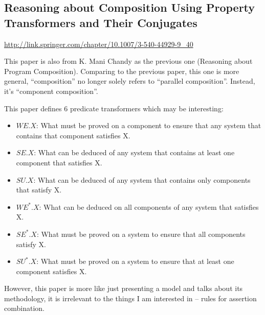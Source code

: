 \documentclass[12pt, fleqn]{article}
\begin{document}
\subsection{Reasoning about Composition Using Property Transformers and Their Conjugates}

\url{http://link.springer.com/chapter/10.1007/3-540-44929-9_40}

\bigskip

This paper is also from K. Mani Chandy as the previous one (Reasoning
about Program Composition). Comparing to the previous paper, this one
is more general, ``composition'' no longer solely refers to ``parallel
composition''. Instead, it's ``component composition''.

This paper defines 6 predicate transformers which may be interesting:

\begin{itemize}
\item $WE.X$: What must be proved on a component to ensure that any
  system that contains that component satisfies X.
\item $SE.X$: What can be deduced of any system that contains at least
  one component that satisfies X.
\item $SU.X$: What can be deduced of any system that contains only
  components that satisfy X.
\item $WE^*.X$: What can be deduced on all components of any system
  that satisfies X.
\item $SE^*.X$: What must be proved on a system to ensure that all
  components satisfy X.
\item $SU^*.X$: What must be proved on a system to ensure that at
  least one component satisfies X.
\end{itemize}

However, this paper is more like just presenting a model and talks
about its methodology, it is irrelevant to the things I am interested
in -- rules for assertion combination.


\end{document}
